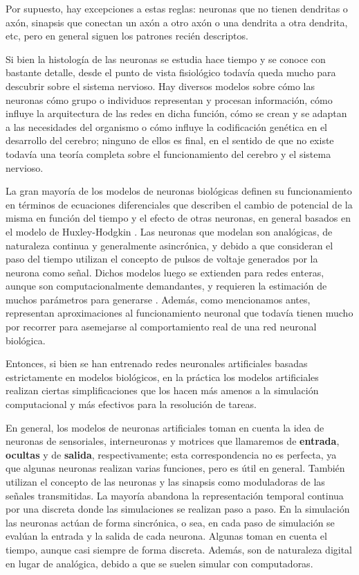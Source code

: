 Por supuesto, hay excepciones a estas reglas: neuronas que no tienen dendritas o axón, sinapsis que conectan un axón a otro axón o una dendrita a otra dendrita, etc, pero en general siguen los patrones recién descriptos.

Si bien la histología de las neuronas se estudia hace tiempo y se conoce con bastante detalle, desde el punto de vista fisiológico todavía queda mucho para descubrir sobre el sistema nervioso. Hay diversos modelos sobre cómo las neuronas cómo grupo o individuos representan y procesan información, cómo influye la arquitectura de las redes en dicha función, cómo se crean y se adaptan a las necesidades del organismo o cómo influye la codificación genética en el desarrollo del cerebro; ninguno de ellos es final, en el sentido de que no existe todavía una teoría completa sobre el funcionamiento del cerebro y el sistema nervioso.

La gran mayoría de los modelos de neuronas biológicas definen su funcionamiento en términos de ecuaciones diferenciales que describen el cambio de potencial de la misma en función del tiempo y el efecto de otras neuronas, en general basados en el modelo de Huxley-Hodgkin \cite{gerstner2002,burkitt2006}. Las neuronas que modelan son analógicas, de naturaleza continua y generalmente asincrónica, y debido a que consideran el paso del tiempo utilizan el concepto de pulsos  de voltaje generados por la neurona como señal. Dichos modelos luego se extienden para redes enteras, aunque son computacionalmente demandantes, y requieren la estimación de muchos parámetros para generarse \cite{brette2007}. Además, como mencionamos antes, representan aproximaciones al funcionamiento neuronal que todavía tienen mucho por recorrer para asemejarse al comportamiento real de una red neuronal biológica. 

Entonces, si bien se han entrenado redes neuronales artificiales basadas estrictamente en modelos biológicos, en la práctica los modelos artificiales realizan ciertas simplificaciones que los hacen más amenos a la simulación computacional y más efectivos para la resolución de tareas. 

En general, los modelos de neuronas artificiales toman en cuenta la idea de neuronas de sensoriales, interneuronas y motrices que llamaremos de \textbf{entrada}, \textbf{ocultas} y de \textbf{salida}, respectivamente; esta correspondencia no es perfecta, ya que algunas neuronas realizan varias funciones, pero es útil en general. También utilizan el concepto de las neuronas y las sinapsis como moduladoras de las señales transmitidas. La mayoría abandona la representación temporal continua por una discreta donde las simulaciones se realizan paso a paso. En la simulación las neuronas actúan de forma sincrónica, o sea, en cada paso de simulación se evalúan la entrada y la salida de cada neurona. Algunas toman en cuenta el tiempo, aunque casi siempre de forma discreta. Además, son de naturaleza digital en lugar de analógica, debido a que se suelen simular con computadoras. 



